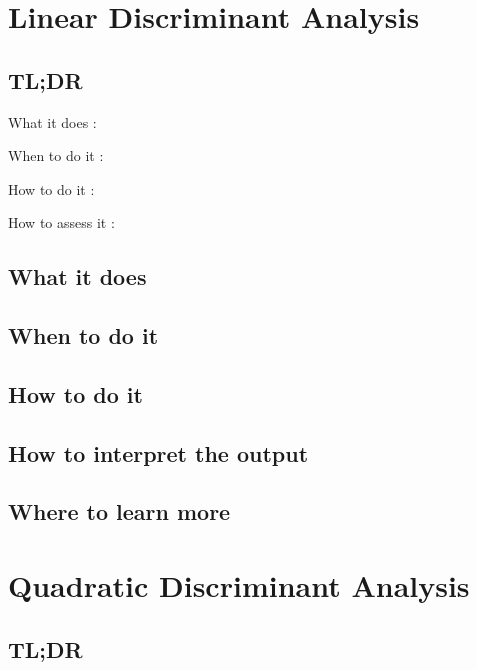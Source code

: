 \documentclass[
]{book}
\begin{document}
\hypertarget{linear-discriminant-analysis}{%
\chapter{Linear Discriminant Analysis}\label{linear-discriminant-analysis}}

\hypertarget{tldr-4}{%
\section{TL;DR}\label{tldr-4}}

What it does
:

When to do it
:

How to do it
:

How to assess it
:

\hypertarget{what-it-does-4}{%
\section{What it does}\label{what-it-does-4}}

\hypertarget{when-to-do-it-4}{%
\section{When to do it}\label{when-to-do-it-4}}

\hypertarget{how-to-do-it-4}{%
\section{How to do it}\label{how-to-do-it-4}}

\hypertarget{how-to-interpret-the-output-4}{%
\section{How to interpret the output}\label{how-to-interpret-the-output-4}}

\hypertarget{where-to-learn-more-4}{%
\section{Where to learn more}\label{where-to-learn-more-4}}

\hypertarget{quadratic-discriminant-analysis}{%
\chapter{Quadratic Discriminant Analysis}\label{quadratic-discriminant-analysis}}

\hypertarget{tldr-5}{%
\section{TL;DR}\label{tldr-5}}
\end{document}
